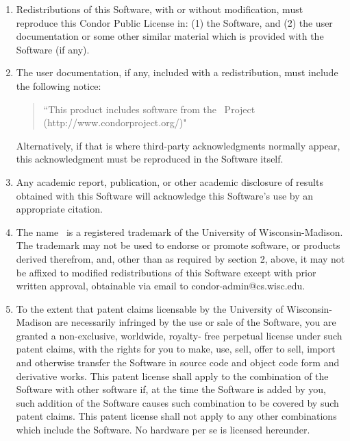 \begin{enumerate}

\item Redistributions of this Software, with or without modification,
   must reproduce this Condor Public License in: (1) the Software,
   and (2) the user documentation or some other similar material
   which is provided with the Software (if any).

\item The user documentation, if any, included with a redistribution, 
   must include the following notice:

	\begin{quote}
       ``This product includes software from the \CondorR\ Project 
	   (http://www.condorproject.org/)"
	\end{quote}
   
   Alternatively, if that is where third-party acknowledgments
   normally appear, this acknowledgment must be reproduced in the
   Software itself.
   
\item Any academic report, publication, or other academic disclosure 
   of results obtained with this Software will acknowledge this
   Software's use by an appropriate citation.

\item The name \CondorR\ is a registered trademark of the University of
   Wisconsin-Madison.  The trademark may not be used to endorse or
   promote software, or products derived therefrom, and, other than
   as required by section 2, above, it may not be affixed to modified
   redistributions of this Software except with prior written
   approval, obtainable via email to condor-admin@cs.wisc.edu.

\item To the extent that patent claims licensable by the University of
   Wisconsin-Madison are necessarily infringed by the use or sale of
   the Software, you are granted a non-exclusive, worldwide, royalty-
   free perpetual license under such patent claims, with the rights
   for you to make, use, sell, offer to sell, import and otherwise
   transfer the Software in source code and object code form and
   derivative works.   This patent license shall apply to the
   combination of the Software with other software if, at the time
   the Software is added by you, such addition of the Software causes
   such combination to be covered by such patent claims. This patent
   license shall not apply to any other combinations which include
   the Software.  No hardware per se is licensed hereunder.


\end{enumerate}
